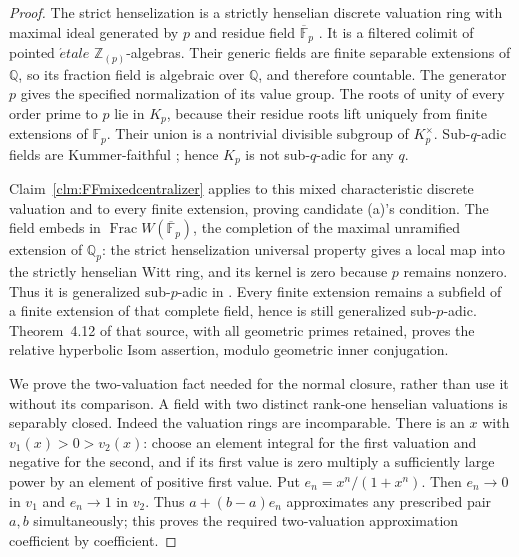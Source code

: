 \begin{proof}
The strict henselization is a strictly henselian discrete
valuation ring with maximal ideal generated by \(p\)
and residue field \(\overline{\mathbb F}_p\)
\citep[Lemmas~10.155.2, 15.46.11]{FF_StacksHensel}.
It is a filtered colimit of pointed \(\acute etale\)
\(\mathbb Z_{(p)}\)-algebras. Their generic fields are
finite separable extensions of \(\mathbb Q\), so its
fraction field is algebraic over \(\mathbb Q\), and
therefore countable. The generator \(p\) gives the
specified normalization of its value group. The roots of
unity of every order prime to \(p\) lie in \(K_p\),
because their residue roots lift uniquely from finite
extensions of \(\mathbb F_p\). Their union is a
nontrivial divisible subgroup of \(K_p^\times\).
Sub-\(q\)-adic fields are Kummer-faithful
\citep[Remark~3.9(2)]{FF_CS2026}; hence \(K_p\) is not
sub-\(q\)-adic for any \(q\).

Claim~\ref{clm:FFmixedcentralizer} applies to this mixed
characteristic discrete valuation and to every finite
extension, proving candidate (a)'s condition.
The field embeds in
\(\operatorname{Frac}W(\overline{\mathbb F}_p)\),
the completion of the maximal unramified extension of
\(\mathbb Q_p\): the strict henselization universal
property gives a local map into the strictly henselian
Witt ring, and its kernel is zero because \(p\) remains
nonzero. Thus it is generalized sub-\(p\)-adic
in \citet[Definition~4.11]{FF_Mochizuki2003}.
Every finite extension remains a subfield of a finite
extension of that complete field, hence is still generalized
sub-\(p\)-adic. Theorem~4.12 of that source, with all
geometric primes retained, proves the relative hyperbolic
Isom assertion, modulo geometric inner conjugation.

We prove the two-valuation fact needed for the normal
closure, rather than use it without its comparison.
A field with two distinct rank-one henselian valuations
is separably closed. Indeed the valuation rings are
incomparable. There is an \(x\) with
\(v_1(x)>0>v_2(x)\): choose an element integral for the
first valuation and negative for the second, and if its
first value is zero multiply a sufficiently large power
by an element of positive first value. Put
\(e_n=x^n/(1+x^n)\). Then \(e_n\to0\) in \(v_1\)
and \(e_n\to1\) in \(v_2\). Thus
\(a+(b-a)e_n\) approximates any prescribed pair \(a,b\)
simultaneously; this proves the required two-valuation
approximation coefficient by coefficient.


\end{proof}
